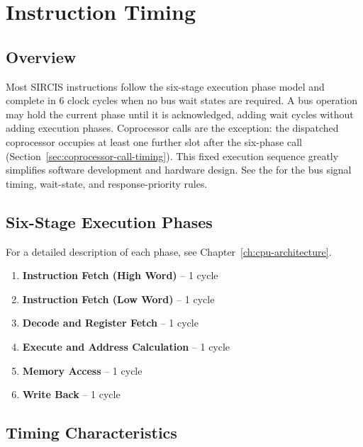 \chapter{Instruction Timing}
\label{appendix:timing}

\section{Overview}

Most SIRCIS instructions follow the six-stage execution phase model and complete in 6 clock cycles when no bus wait
states are required. A bus operation may hold the current phase until it is acknowledged, adding wait cycles without
adding execution phases. Coprocessor calls are the exception: the dispatched coprocessor occupies at least one further
slot after the six-phase call (Section~\ref{sec:coprocessor-call-timing}). This fixed execution sequence greatly
simplifies software development and hardware design. See the \hwmanual{} for the bus signal timing, wait-state, and
response-priority rules.

\section{Six-Stage Execution Phases}

For a detailed description of each phase, see Chapter~\ref{ch:cpu-architecture}.

\begin{enumerate}
	\item \textbf{Instruction Fetch (High Word)} -- 1 cycle
	\item \textbf{Instruction Fetch (Low Word)} -- 1 cycle
	\item \textbf{Decode and Register Fetch} -- 1 cycle
	\item \textbf{Execute and Address Calculation} -- 1 cycle
	\item \textbf{Memory Access} -- 1 cycle
	\item \textbf{Write Back} -- 1 cycle
\end{enumerate}

\section{Timing Characteristics}

